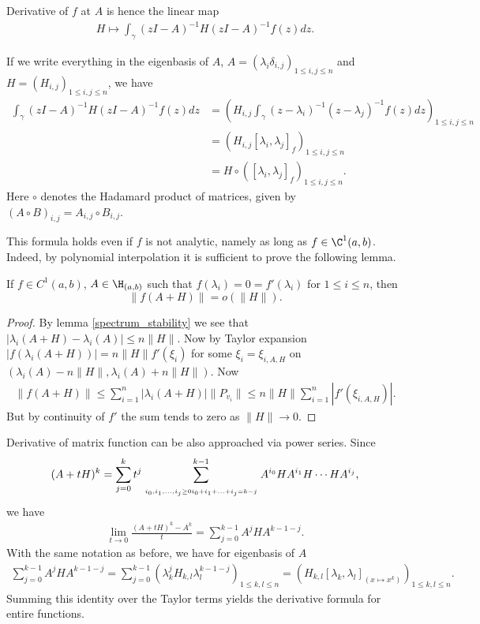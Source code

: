 Derivative of $f$ at $A$ is hence the linear map
\begin{align*}
	H \mapsto \int_{\gamma} (z I - A)^{-1} H (z I - A)^{-1} f(z) dz.
\end{align*}

If we write everything in the eigenbasis of $A$, $A = (\lambda_{i} \delta_{i, j})_{1 \leq i, j \leq n}$ and $H = (H_{i, j})_{1 \leq i,j \leq n}$, we have
\begin{align*}
	\int_{\gamma} (z I - A)^{-1} H (z I - A)^{-1} f(z) dz &= \left(H_{i, j} \int_{\gamma} (z - \lambda_{i})^{-1} (z - \lambda_{j})^{-1} f(z) dz \right)_{1 \leq i, j \leq n} \\
	&= \left(H_{i, j} [\lambda_{i}, \lambda_{j}]_{f} \right)_{1 \leq i, j \leq n} \\
	&= H \circ \left([\lambda_{i}, \lambda_{j}]_{f} \right)_{1 \leq i, j \leq n}.
\end{align*}
Here $\circ$ denotes the Hadamard product of matrices, given by $(A \circ B)_{i, j} = A_{i, j} \circ B_{i, j}$.

This formula holds even if $f$ is not analytic, namely as long as $f \in \C^{1}(a, b)$. Indeed, by polynomial interpolation it is sufficient to prove the following lemma.
\begin{lem}
	If $f \in C^{1}(a, b)$, $A \in \H_{(a, b)}$ such that $f(\lambda_{i}) = 0 = f'(\lambda_{i})$ for $1 \leq i \leq n$, then
	\[
		\|f(A + H)\| = o(\|H\|).
	\]
\end{lem}
\begin{proof}
	By lemma \ref{spectrum_stability} we see that $|\lambda_{i}(A + H) - \lambda_{i}(A)| \leq n \|H\|$. Now by Taylor expansion $|f(\lambda_{i}(A + H))| =  n \|H\| f'(\xi_{i})$ for some $\xi_{i} = \xi_{i, A, H}$ on $(\lambda_{i}(A) - n \|H\|, \lambda_{i}(A) + n \|H\|)$. Now
	\begin{align*}
		\|f(A + H)\| \leq \sum_{i = 1}^{n} |\lambda_{i}(A + H)| \|P_{v_{i}}\| \leq n \|H\| \sum_{i = 1}^{n} |f'(\xi_{i, A, H})|.
	\end{align*}
	But by continuity of $f'$ the sum tends to zero as $\|H\| \to 0$.
\end{proof}

Derivative of matrix function can be also approached via power series. Since
\begin{align*}
	(A + t H)^{k} = \sum_{j = 0}^{k}t^{j}\sum_{\atop{i_{0}, i_{1}, \ldots, i_{j} \geq 0}{i_{0} + i_{1} + \ldots + i_{j} = k - j}}^{k - 1} A^{i_{0}} H A^{i_{1}} H \cdots H A^{i_{j}},
\end{align*}
we have
\begin{align*}
	\lim_{t \to 0}\frac{(A + t H)^{k} - A^{k}}{t} = \sum_{j = 0}^{k - 1}A^{j} H A^{k - 1 - j}.
\end{align*}
With the same notation as before, we have for eigenbasis of $A$
\begin{align*}
	\sum_{j = 0}^{k - 1}A^{j} H A^{k - 1 - j}= \sum_{j = 0}^{k - 1}\left( \lambda_{k}^{j}H_{k, l} \lambda_{l}^{k - 1 - j}\right)_{1 \leq k, l \leq n} = \left(H_{k, l} [\lambda_{k}, \lambda_{l}]_{(x \mapsto x^{k})}\right)_{1 \leq k, l \leq n}.
\end{align*}
Summing this identity over the Taylor terms yields the derivative formula for entire functions.

